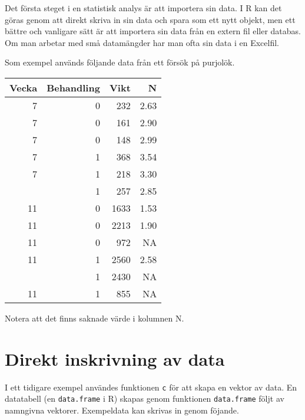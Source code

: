 \documentclass[
]{book}
\theoremstyle{definition}
\theoremstyle{definition}
\theoremstyle{definition}
\theoremstyle{definition}
\theoremstyle{remark}
\begin{document}
Det första steget i en statistisk analys är att importera sin data. I R kan det göras genom att direkt skriva in sin data och spara som ett nytt objekt, men ett bättre och vanligare sätt är att importera sin data från en extern fil eller databas. Om man arbetar med små datamängder har man ofta sin data i en Excelfil.

Som exempel används följande data från ett försök på purjolök.

\begin{table}
\centering
\begin{tabular}[t]{rrrr}
\toprule
Vecka & Behandling & Vikt & N\\
\midrule
7 & 0 & 232 & 2.63\\
7 & 0 & 161 & 2.90\\
7 & 0 & 148 & 2.99\\
7 & 1 & 368 & 3.54\\
7 & 1 & 218 & 3.30\\
\addlinespace
7 & 1 & 257 & 2.85\\
11 & 0 & 1633 & 1.53\\
11 & 0 & 2213 & 1.90\\
11 & 0 & 972 & NA\\
11 & 1 & 2560 & 2.58\\
\addlinespace
11 & 1 & 2430 & NA\\
11 & 1 & 855 & NA\\
\bottomrule
\end{tabular}
\end{table}

Notera att det finns saknade värde i kolumnen N.

\hypertarget{direkt-inskrivning-av-data}{%
\section{Direkt inskrivning av data}\label{direkt-inskrivning-av-data}}

I ett tidigare exempel användes funktionen \texttt{c} för att skapa en vektor av data. En datatabell (en \texttt{data.frame} i R) skapas genom funktionen \texttt{data.frame} följt av namngivna vektorer. Exempeldata kan skrivas in genom föjande.
\end{document}
